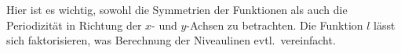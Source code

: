 \documentclass[12pt]{article}
\begin{document}
\begin{tips}{1}
    Hier ist es wichtig, sowohl die Symmetrien der Funktionen als auch die Periodizität in Richtung der $x$- und $y$-Achsen zu betrachten. Die Funktion $l$ lässt sich faktorisieren, was Berechnung der Niveaulinen evtl.\ vereinfacht.
\end{tips}
\end{document}
